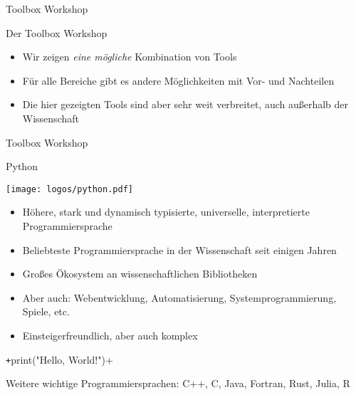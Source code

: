 \begin{frame}{Toolbox Workshop}
  \begin{center}
    \textcolor{vertexDarkRed}{\Huge Der Toolbox Workshop}\\[\baselineskip]
    \begin{itemize}
      \item Wir zeigen \emph{eine mögliche} Kombination von Tools 
      \item Für alle Bereiche gibt es andere Möglichkeiten mit Vor- und Nachteilen
      \item Die hier gezeigten Tools sind aber sehr weit verbreitet, auch außerhalb der Wissenschaft
    \end{itemize}
  \end{center}
\end{frame}


\begin{frame}
  \vspace*{1cm}
  \begin{center}
    \Huge Toolbox Workshop
  \end{center}
\end{frame}


\begin{frame}[fragile]{Python}
  \begin{center}
      \texttt{[image: logos/python.pdf]}%
  \end{center}

  \begin{itemize}
    \item Höhere, stark und dynamisch typisierte, universelle, interpretierte Programmiersprache
    \item Beliebteste Programmiersprache in der Wissenschaft seit einigen Jahren
    \item Großes Ökosystem an wissenschaftlichen Bibliotheken
    \item Aber auch: Webentwicklung, Automatisierung, Systemprogrammierung, Spiele, etc.
    \item Einsteigerfreundlich, aber auch komplex
  \end{itemize}

  \begin{center}
    \texttt+print("Hello, World!")+
  \end{center}

  Weitere wichtige Programmiersprachen: C++, C, Java, Fortran, Rust, Julia, R
\end{frame}


